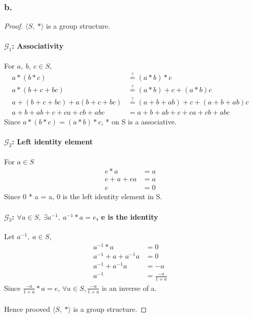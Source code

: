 \documentclass{article}
\begin{document}
\subsubsection*{b.}
	\begin{addmargin}[1em]{1em}
		\begin{proof} $\langle S,\ * \rangle$ is a group structure.
		\paragraph{$\mathcal{G}_1$: Associativity} For $a,\ b,\ c\in S$,
			\begin{align*}
				a*(b*c) &\stackrel{?}{=} (a*b)*c&\\
		  	a*(b+c+bc) &\stackrel{?}{=} (a*b) + c + (a*b)c&\\
		  	a + (b+c+bc) + a(b+c+bc) &\stackrel{?}{=}(a+b+ab)+c+(a+b+ab)c&\\
		  	a + b+ ab+c+ca+cb+abc &=a+b+ab+c+ca+cb+abc&
			\end{align*}
			Since $a*(b*c) = (a*b)*c$, * on S is a associative.
		\paragraph{$\mathcal{G}_2$: Left identity element} For $a \in S$
			\begin{align*}
				e * a &= a&\\
				e + a + ea &= a&\\
				e &= 0&
			\end{align*}
			Since 0 * a = a, 0 is the left identity element in S.
		\paragraph{$\mathcal{G}_3$: $\forall a \in S,\ \exists a^{-1},\ a^{-1}*a=e$,
			e is the identity}
			Let $a^{-1},\ a \in S$,
			\begin{align*}
				a^{-1} * a &= 0&\\
				a^{-1} + a + a^{-1}a &= 0&\\
				a^{-1} + a^{-1}a &= -a&\\
				a^{-1} &= \frac{-a}{1+a}&
			\end{align*}
			Since $\frac{-a}{1+a} * a=e$, $\forall a \in S, \frac{-a}{1+a}$ is an
			inverse of a.\\ \\
			Hence prooved $\langle S,\ * \rangle$ is a group structure.
			\end{proof}
	\end{addmargin}
\end{document}

